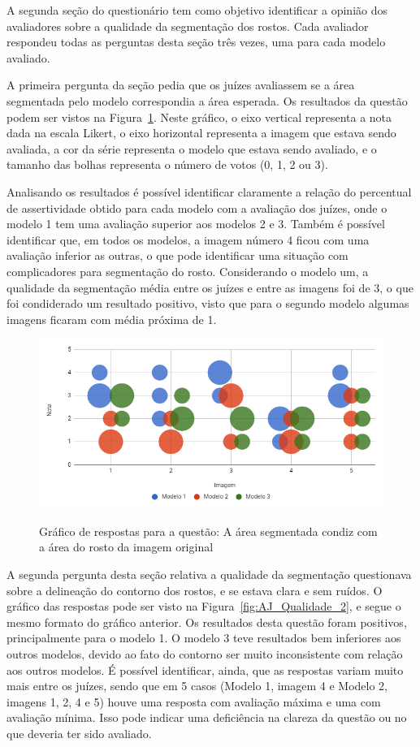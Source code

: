 \documentclass[12pt,oneside,a4paper,english,french,spanish,brazil,]{abntex2}
\begin{document}
A segunda seção do questionário tem como objetivo identificar a opinião dos avaliadores sobre a qualidade da segmentação dos rostos. Cada avaliador respondeu todas as perguntas desta seção três vezes, uma para cada modelo avaliado. 

A primeira pergunta da seção pedia que os juízes avaliassem se a área segmentada pelo modelo correspondia a área esperada. Os resultados da questão podem ser vistos na Figura~\ref{fig:AJ_Qualidade_1}. Neste gráfico, o eixo vertical representa a nota dada na escala Likert, o eixo horizontal representa a imagem que estava sendo avaliada, a cor da série representa o modelo que estava sendo avaliado, e o tamanho das bolhas representa o número de votos (0, 1, 2 ou 3).

Analisando os resultados é possível identificar claramente a relação do percentual de assertividade obtido para cada modelo com a avaliação dos juízes, onde o modelo 1 tem uma avaliação superior aos modelos 2 e 3. Também é possível identificar que, em todos os modelos, a imagem número 4 ficou com uma avaliação inferior as outras, o que pode identificar uma situação com complicadores para segmentação do rosto. Considerando o modelo um, a qualidade da segmentação média entre os juízes e entre as imagens foi de 3, o que foi condiderado um resultado positivo, visto que para o segundo modelo algumas imagens ficaram com média próxima de 1.

\begin{figure}[ht]
\centering
\caption{Gráfico de respostas para a questão: A área segmentada condiz com a área do rosto da imagem original}
\includegraphics[width=1.0\textwidth]{imagens/Avaliacao_Juizes/Qualidade_1.PNG}
\sourceAuthor{}
\label{fig:AJ_Qualidade_1}
\end{figure}

A segunda pergunta desta seção relativa a qualidade da segmentação questionava sobre a delineação do contorno dos rostos, e se estava clara e sem ruídos. O gráfico das respostas pode ser visto na Figura~\ref{fig:AJ_Qualidade_2}, e segue o mesmo formato do gráfico anterior. Os resultados desta questão foram positivos, principalmente para o modelo 1. O modelo 3 teve resultados bem inferiores aos outros modelos, devido ao fato do contorno ser muito inconsistente com relação aos outros modelos. É possível identificar, ainda, que as respostas variam muito mais entre os juízes, sendo que em 5 casos (Modelo 1, imagem 4 e Modelo 2, imagens 1, 2, 4 e 5) houve uma resposta com avaliação máxima e uma com avaliação mínima. Isso pode indicar uma deficiência na clareza da questão ou no que deveria ter sido avaliado.
\end{document}
